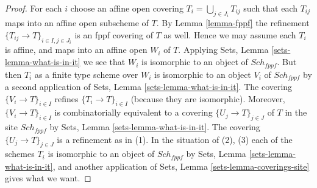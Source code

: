 \documentclass[10pt,a4paper]{amsart}
\theoremstyle{plain}
\theoremstyle{definition}
\theoremstyle{remark}
\numberwithin{equation}{subsection}
\def\Sch{\mathit{Sch}}
\begin{document}
\begin{proof}
For each $i$ choose an affine open covering $T_i = \bigcup_{j \in J_i} T_{ij}$
such that each $T_{ij}$ maps into an affine open subscheme of $T$. By
Lemma \ref{lemma-fppf}
the refinement $\{T_{ij} \to T\}_{i \in I, j \in J_i}$ is an fppf covering
of $T$ as well. Hence we may assume each $T_i$ is affine, and maps into
an affine open $W_i$ of $T$. Applying
Sets, Lemma \ref{sets-lemma-what-is-in-it}
we see that $W_i$ is isomorphic to an object of $\Sch_{fppf}$.
But then $T_i$ as a finite type scheme over $W_i$
is isomorphic to an object $V_i$ of $\Sch_{fppf}$ by a second
application of
Sets, Lemma \ref{sets-lemma-what-is-in-it}.
The covering $\{V_i \to T\}_{i \in I}$ refines $\{T_i \to T\}_{i \in I}$
(because they are isomorphic).
Moreover, $\{V_i \to T\}_{i \in I}$ is combinatorially equivalent to a
covering $\{U_j \to T\}_{j \in J}$ of $T$ in the site
$\Sch_{fppf}$ by
Sets, Lemma \ref{sets-lemma-what-is-in-it}.
The covering $\{U_j \to T\}_{j \in J}$ is a refinement as in (1).
In the situation of (2), (3) each of the
schemes $T_i$ is isomorphic to an object of $\Sch_{fppf}$ by
Sets, Lemma \ref{sets-lemma-what-is-in-it},
and another application of
Sets, Lemma \ref{sets-lemma-coverings-site}
gives what we want.
\end{proof}
\end{document}
